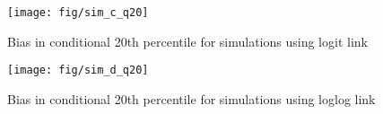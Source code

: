 \documentclass[
]{article}
\begin{document}
\begin{figure}

{\centering \texttt{[image: fig/sim\_c\_q20]} 

}

\caption{Bias in conditional 20th percentile for simulations using logit link}\label{fig:simplt-q20-b}
\end{figure}

\begin{figure}

{\centering \texttt{[image: fig/sim\_d\_q20]} 

}

\caption{Bias in conditional 20th percentile for simulations using loglog link}\label{fig:simplt-q20-c}
\end{figure}
\end{document}
